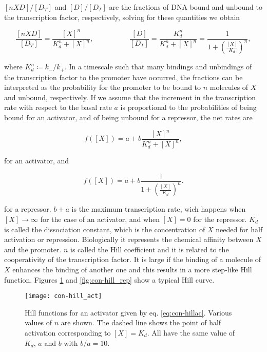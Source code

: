 $[nXD]/[D_T]$ and $[D]/[D_T]$ are the fractions of DNA bound and unbound to the transcription factor, respectively, solving for these quantities we obtain

\begin{equation*}
  \frac{[nXD]}{[D_T]} = \frac{[X]^n}{K_d^n+[X]^n}, \quad\quad\quad\quad\quad  \frac{[D]}{[D_T]} = \frac{K_d^n}{K_d^n+[X]^n} = \frac{1}{1+\left(\frac{[X]}{K_d}\right)^n},
\end{equation*}

where $K_d^n \coloneqq k_-/k_+$. In a timescale such that many bindings and unbindings of the transcription factor to the promoter have occurred, the fractions can be interpreted as the probability for the promoter to be bound to $n$ molecules of $X$ and unbound, respectively. If we assume that the increment in the transcription rate with respect to the basal rate $a$ is proportional to the probabilities of being bound for an activator, and of being unbound for a repressor, the net rates are

\begin{equation}
  \label{eq:con-hillac}
  f([X]) = a + b \frac{[X]^n}{K_d^n+[X]^n},
\end{equation}

for an activator, and

\begin{equation}
  \label{eq:con-hillrep}
  f([X]) = a + b \frac{1}{1+\left(\frac{[X]}{K_d}\right)^n}.
\end{equation}

for a repressor. $b+a$ is the maximum transcription rate, wich happens when $[X]\rightarrow\infty$ for the case of an activator, and when $[X]=0$ for the repressor. $K_d$ is called the dissociation constant, which is the concentration of $X$ needed for half activation or repression. Biologically it represents the chemical affinity between $X$ and the promoter. $n$ is called the Hill coefficient and it is related to the cooperativity of the transcription factor. It is large if the binding of a molecule of $X$ enhances the binding of another one and this results in a more step-like Hill function. Figures \ref{fig:con-hill_act} and \ref{fig:con-hill_rep} show a typical Hill curve.

\begin{figure}[H]
  \centering
  \texttt{[image: con-hill\_act]}
  \caption[Hill functions for an activator]{\label{fig:con-hill_act} Hill functions for an activator given by eq. \eqref{eq:con-hillac}. Various values of $n$ are shown. The dashed line shows the point of half activation corresponding to $[X]=K_d$. All have the same value of $K_d$, $a$ and $b$ with $b/a=10$.}
\end{figure}

